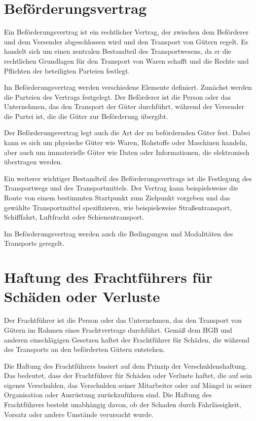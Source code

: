 \section{Beförderungsvertrag}
Ein Beförderungsvertrag ist ein rechtlicher Vertrag, der zwischen dem Beförderer und dem Versender abgeschlossen wird und den Transport von Gütern regelt. Es handelt sich um einen zentralen Bestandteil des Transportwesens, da er die rechtlichen Grundlagen für den Transport von Waren schafft und die Rechte und Pflichten der beteiligten Parteien festlegt.

Im Beförderungsvertrag werden verschiedene Elemente definiert. Zunächst werden die Parteien des Vertrags festgelegt. Der Beförderer ist die Person oder das Unternehmen, das den Transport der Güter durchführt, während der Versender die Partei ist, die die Güter zur Beförderung übergibt.

Der Beförderungsvertrag legt auch die Art der zu befördernden Güter fest. Dabei kann es sich um physische Güter wie Waren, Rohstoffe oder Maschinen handeln, aber auch um immaterielle Güter wie Daten oder Informationen, die elektronisch übertragen werden.

Ein weiterer wichtiger Bestandteil des Beförderungsvertrags ist die Festlegung des Transportwegs und des Transportmittels. Der Vertrag kann beispielsweise die Route von einem bestimmten Startpunkt zum Zielpunkt vorgeben und das gewählte Transportmittel spezifizieren, wie beispielsweise Straßentransport, Schifffahrt, Luftfracht oder Schienentransport.

Im Beförderungsvertrag werden auch die Bedingungen und Modalitäten des Transports geregelt.
\section{Haftung des Frachtführers für Schäden oder Verluste}
Der Frachtführer ist die Person oder das Unternehmen, das den Transport von Gütern im Rahmen eines Frachtvertrags durchführt. Gemäß dem HGB und anderen einschlägigen Gesetzen haftet der Frachtführer für Schäden, die während des Transports an den beförderten Gütern entstehen.

Die Haftung des Frachtführers basiert auf dem Prinzip der Verschuldenshaftung. Das bedeutet, dass der Frachtführer für Schäden oder Verluste haftet, die auf sein eigenes Verschulden, das Verschulden seiner Mitarbeiter oder auf Mängel in seiner Organisation oder Ausrüstung zurückzuführen sind. Die Haftung des Frachtführers besteht unabhängig davon, ob der Schaden durch Fahrlässigkeit, Vorsatz oder andere Umstände verursacht wurde.

